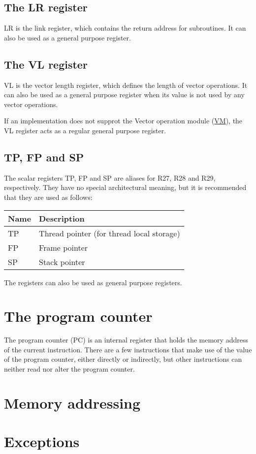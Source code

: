 \subsection{The LR register}

LR is the link register, which contains the return address for subroutines. It
can also be used as a general purpose register.

\subsection{The VL register}

VL is the vector length register, which defines the length of vector
operations. It can also be used as a general purpose register when its value
is not used by any vector operations.

If an implementation does not supprot the Vector operation module
(\hyperref[module:VM]{VM}), the VL register acts as a regular general purpose
register.

\subsection{TP, FP and SP}

The scalar registers TP, FP and SP are aliases for R27, R28 and R29,
respectively. They have no special architectural meaning, but it is recommended
that they are used as follows:

\begin{tabular}{|l|l|}
  \hline
  \textbf{Name} & \textbf{Description} \\
  \hline
  TP & Thread pointer (for thread local storage) \\
  \hline
  FP & Frame pointer \\
  \hline
  SP & Stack pointer \\
  \hline
\end{tabular}

The registers can also be used as general purpose registers.

\section{The program counter}

The program counter (PC) is an internal register that holds the memory address
of the current instruction. There are a few instructions that make use of the
value of the program counter, either directly or indirectly, but other
instructions can neither read nor alter the program counter.

\section{Memory addressing}

\tbd

\section{Exceptions}

\tbd
